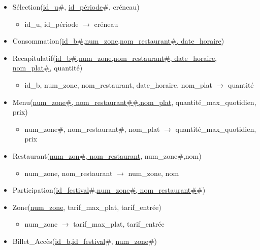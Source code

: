 \documentclass{article}
\begin{document}
\begin{itemize}
     \item Sélection(\underline{id\_u}\#, \underline{id\_période}\#, créneau)
     \begin{itemize}
         \item id\_u, id\_période $\rightarrow$ créneau
     \end{itemize}
    
    \item Consommation(\underline{id\_b\#,num\_zone,nom\_restaurant\#, date\_horaire})

    \item Recapitulatif(\underline{id\_b\#,num\_zone,nom\_restaurant\#, date\_horaire, nom\_plat\#}, quantité)
    \begin{itemize}
        \item id\_b, num\_zone, nom\_restaurant, date\_horaire, nom\_plat $\rightarrow$ quantité
    \end{itemize}
    
    \item Menu(\underline{num\_zone\#, nom\_restaurant\#\#,nom\_plat}, quantité\_max\_quotidien, prix)
    \begin{itemize}
        \item num\_zone\#, nom\_restaurant\#, nom\_plat $\rightarrow$ quantité\_max\_quotidien, prix 
    \end{itemize}
    
    \item Restaurant(\underline{num\_zon\#, nom\_restaurant}, num\_zone\#,nom)
    \begin{itemize}
        \item num\_zone, nom\_restaurant $\rightarrow$ num\_zone, nom 
    \end{itemize}

    \item Participation(\underline{id\_festival}\#,\underline{num\_zone\#, nom\_restaurant\#}\#)
    
    \item Zone(\underline{num\_zone}, tarif\_max\_plat, tarif\_entrée)
    \begin{itemize}
        \item num\_zone $\rightarrow$ tarif\_max\_plat, tarif\_entrée
    \end{itemize}
    \item Billet\_Accès(\underline{id\_b,id\_festival}\#, \underline{num\_zone}\#)

\end{itemize}
\end{document}
